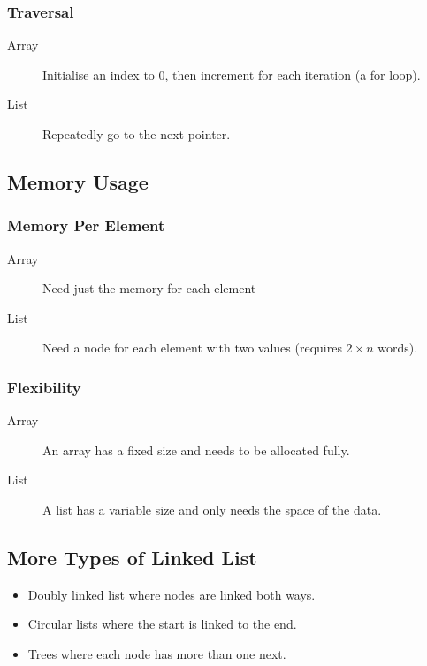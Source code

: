 \subsubsection{Traversal}\label{ssub:traversal}

\begin{description}
	\item[Array] Initialise an index to \(0\), then increment for each iteration (a for loop).
	\item[List] Repeatedly go to the next pointer.
\end{description}

\subsection{Memory Usage}\label{sub:memory_usage}

\subsubsection{Memory Per Element}\label{ssub:memory_per_element}

\begin{description}
	\item[Array] Need just the memory for each element
	\item[List] Need a node for each element with two values (requires \(2 \times n\) words).
\end{description}

\subsubsection{Flexibility}\label{ssub:flexibility}

\begin{description}
	\item[Array] An array has a fixed size and needs to be allocated fully.
	\item[List] A list has a variable size and only needs the space of the data.
\end{description}

\subsection{More Types of Linked List}\label{sub:more_types_of_linked_list}

\begin{itemize}
	\item Doubly linked list where nodes are linked both ways.
	\item Circular lists where the start is linked to the end.
	\item Trees where each node has more than one next.
\end{itemize}
